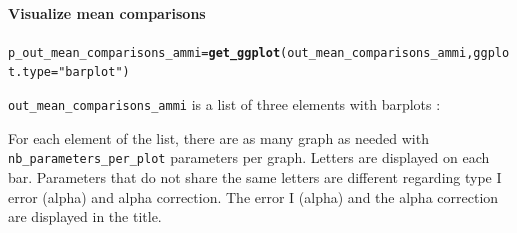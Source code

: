 \documentclass{book}\usepackage[]{graphicx}\usepackage[]{color}
\makeatletter
\newcommand{\hlstr}[1]{\textcolor[rgb]{0.192,0.494,0.8}{#1}}%
\newcommand{\hlstd}[1]{\textcolor[rgb]{0.345,0.345,0.345}{#1}}%
\newcommand{\hlkwb}[1]{\textcolor[rgb]{0.69,0.353,0.396}{#1}}%
\newcommand{\hlkwc}[1]{\textcolor[rgb]{0.333,0.667,0.333}{#1}}%
\newcommand{\hlkwd}[1]{\textcolor[rgb]{0.737,0.353,0.396}{\textbf{#1}}}%
\newenvironment{kframe}{%
 \def\at@end@of@kframe{}%
 \ifinner\ifhmode%
  \def\at@end@of@kframe{\end{minipage}}%
  \begin{minipage}{\columnwidth}%
 \fi\fi%
 \def\FrameCommand##1{\hskip\@totalleftmargin \hskip-\fboxsep
 \colorbox{shadecolor}{##1}\hskip-\fboxsep
     \hskip-\linewidth \hskip-\@totalleftmargin \hskip\columnwidth}%
 \MakeFramed {\advance\hsize-\width
   \@totalleftmargin\z@ \linewidth\hsize
   \@setminipage}}%
 {\par\unskip\endMakeFramed%
 \at@end@of@kframe}
\newenvironment{knitrout}{}{} %
\makeatother
\begin{document}
\paragraph{Visualize mean comparisons}

\begin{knitrout}
\color{fgcolor}\begin{kframe}
\begin{alltt}
\hlstd{p_out_mean_comparisons_ammi} \hlkwb{=} \hlkwd{get_ggplot}\hlstd{(out_mean_comparisons_ammi,} \hlkwc{ggplot.type} \hlstd{=} \hlstr{"barplot"}\hlstd{)}
\end{alltt}
\end{kframe}
\end{knitrout}

\texttt{out\_mean\_comparisons\_ammi} is a list of three elements with barplots :

For each element of the list, there are as many graph as needed with \texttt{nb\_parameters\_per\_plot} parameters per graph.
Letters are displayed on each bar. Parameters that do not share the same letters are different regarding type I error (alpha) and alpha correction. 
The error I (alpha) and the alpha correction are displayed in the title. 
\end{document}
